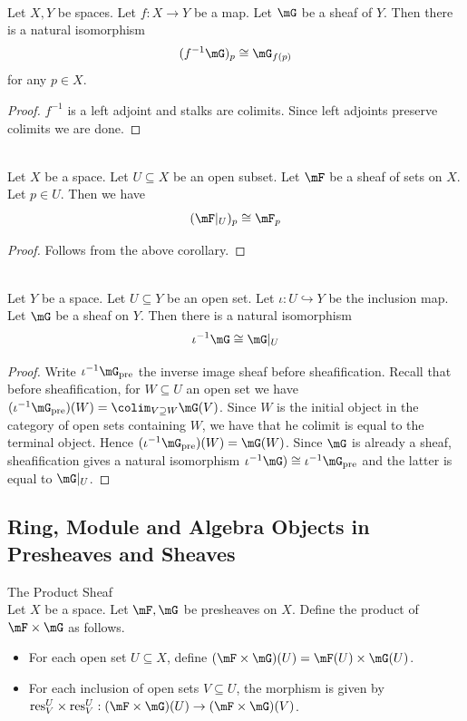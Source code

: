\documentclass[a4paper]{article}
\begin{document}
\begin{crl}{}{}\\
Let $X,Y$ be spaces. Let $f:X\to Y$ be a map. Let $\mG$ be a sheaf of $Y$. Then there is a natural isomorphism $$(f^{-1}\mG)_p\cong\mG_{f(p)}$$ for any $p\in X$. 
\begin{proof}
$f^{-1}$ is a left adjoint and stalks are colimits. Since left adjoints preserve colimits we are done. 
\end{proof}
\end{crl}

\begin{eg}{}{}\\
Let $X$ be a space. Let $U\subseteq X$ be an open subset. Let $\mF$ be a sheaf of sets on $X$. Let $p\in U$. Then we have $$(\mF|_U)_p\cong\mF_p$$
\begin{proof}
Follows from the above corollary. 
\end{proof}
\end{eg}

\begin{lmm}{}{}\\
Let $Y$ be a space. Let $U\subseteq Y$ be an open set. Let $\iota:U\hookrightarrow Y$ be the inclusion map. Let $\mG$ be a sheaf on $Y$. Then there is a natural isomorphism $$\iota^{-1}\mG\cong\mG|_U$$
\begin{proof}
Write $\iota^{-1}\mG_\text{pre}$ the inverse image sheaf before sheafification. Recall that before sheafification, for $W\subseteq U$ an open set we have $(\iota^{-1}\mG_\text{pre})(W)=\colim_{V\supseteq W}\mG(V)$. Since $W$ is the initial object in the category of open sets containing $W$, we have that he colimit is equal to the terminal object. Hence $(\iota^{-1}\mG_\text{pre})(W)=\mG(W)$. Since $\mG$ is already a sheaf, sheafification gives a natural isomorphism $\iota^{-1}\mG)\cong\iota^{-1}\mG_\text{pre}$ and the latter is equal to $\mG|_U$. 
\end{proof}
\end{lmm}

\subsection{Ring, Module and Algebra Objects in Presheaves and Sheaves}
\begin{defn}{The Product Sheaf}{}\\
Let $X$ be a space. Let $\mF,\mG$ be presheaves on $X$. Define the product of $\mF\times\mG$ as follows. 
\begin{itemize}
\item For each open set $U\subseteq X$, define $(\mF\times\mG)(U)=\mF(U)\times\mG(U)$. 
\item For each inclusion of open sets $V\subseteq U$, the morphism is given by $\text{res}_V^U\times\text{res}_V^U:(\mF\times\mG)(U)\to(\mF\times\mG)(V)$. 
\end{itemize}
\end{defn}
\end{document}
